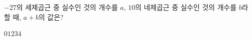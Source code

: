 $-27$의 세제곱근 중 실수인 것의 개수를 $a$, $10$의 네제곱근 중 실수인 것의 개수를 $b$라 할 때, $a+b$의 값은?
\begin{choices32}{$0$}{$1$}{$2$}{$3$}{$4$}\end{choices32}
